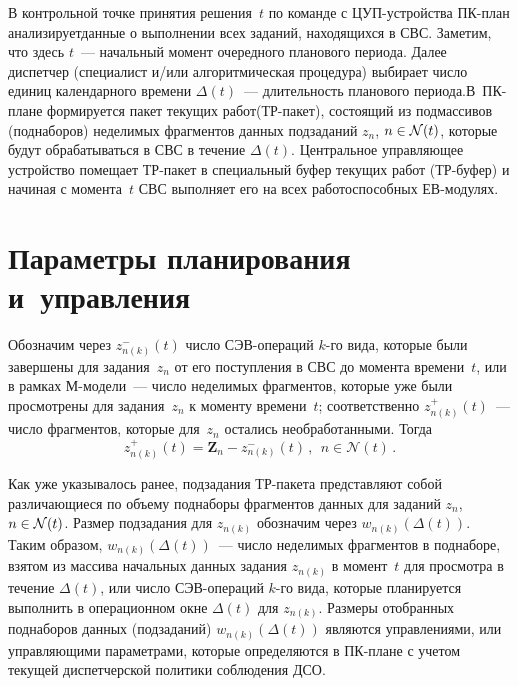 \begin{multicols}{2}
В контрольной точке принятия решения~$t$ по команде с
ЦУП-устрой\-ст\-ва ПК-план анализирует\linebreak данные о  выполнении всех
заданий, находящихся в СВС. Заметим, что  здесь $t$~--- начальный\linebreak
момент очередного планового периода. Далее диспетчер (специалист
и/или алгоритмическая процедура)  выбирает число единиц календарного
времени $\Delta(t)$~--- длительность планового периода.\linebreak  В~ПК-пла\-не
формируется пакет текущих работ\linebreak (ТР-па\-кет), состоящий из подмассивов
(поднаборов) неделимых фрагментов данных  подзаданий $z_{n}$, $n \hm\in
\mathcal{N}(t)$, которые будут  обрабатываться в СВС   в течение $\Delta(t)$.
Центральное управ\-ля\-ющее устрой\-ст\-во  помещает  ТР-пакет в специальный буфер текущих работ
(ТР-бу\-фер) и начиная с момента~$t$   СВС выполняет  его на всех
работоспособных ЕВ-мо\-дулях.

\section{Параметры планирования и~управления }

Обозначим через $z^-_{n(k)}(t)$ число СЭВ-опе\-ра\-ций $k$-го вида,
которые были завершены для задания~$z_n$ от его поступления в СВС до
момента времени~$t$, или в рамках М-мо\-де\-ли~--- чис\-ло неделимых
фрагментов, которые уже были просмотрены для задания~$z_n$ к моменту
времени~$t$;  соответственно $z^+_{n(k)}(t)$~--- число фрагментов,
которые  для~$z_n$ остались необработанными. Тогда
$$
z^+_{n(k)}(t)= \textbf{Z}_{n} - z_{n(k)}^-(t)\,, \ \ n \in \mathcal{N}(t)\,.      
$$

Как уже указывалось ранее, подзадания ТР-па\-ке\-та представляют собой
различающиеся по объему поднаборы фрагментов данных для заданий
$z_n$, $n \hm\in \mathcal{N}(t)$. Размер подзадания для  $z_{n{(k)}}$ обозначим
через $w_{n(k)}(\Delta(t))$. Таким образом, $w_{n(k)}(\Delta(t))$~--- 
чис\-ло неделимых фрагментов  в поднаборе, взятом из массива
начальных данных задания $z_{n(k)}$ в момент~$t$ для просмотра в
течение  $\Delta(t)$, или чис\-ло СЭВ-опе\-ра\-ций  $k$-го вида, которые
планируется выполнить в операционном окне $\Delta(t)$ для
$z_{n(k)}$. Размеры отобранных поднаборов данных (подзаданий)
$w_{n(k)}(\Delta(t))$  являются управ\-ле\-ни\-ями, или управляющими
параметрами, которые определяются в ПК-пла\-не с учетом текущей
диспетчерской политики соблюдения ДСО.



\end{multicols}

